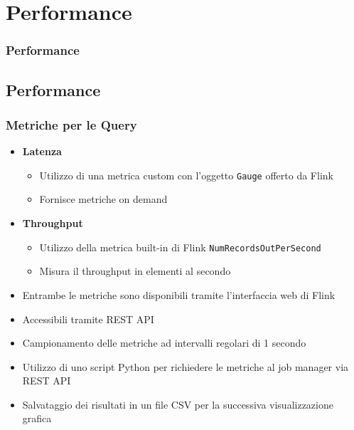\documentclass[13pt,aspectratio=169,t,xcolor=table]{beamer}
\begin{document}
\section{Performance}
\begin{frame}{}
    \frametitle{Performance}
\end{frame}

\subsection{Performance}
\begin{frame}
    \frametitle{Metriche per le Query}
    \begin{itemize}
        \item \textbf{Latenza}
            \begin{itemize}
                \item Utilizzo di una metrica custom con l'oggetto \texttt{Gauge} offerto da Flink
                \item Fornisce metriche on demand
            \end{itemize}
        \item \textbf{Throughput}
            \begin{itemize}
                \item Utilizzo della metrica built-in di Flink \texttt{NumRecordsOutPerSecond}
                \item Misura il throughput in elementi al secondo
            \end{itemize}
    \end{itemize}
    \vspace{0.5cm}
    \begin{itemize}
        \item Entrambe le metriche sono disponibili tramite l'interfaccia web di Flink
        \item Accessibili tramite REST API
    \end{itemize}
    \vspace{0.5cm}
    \begin{itemize}
        \item Campionamento delle metriche ad intervalli regolari di 1 secondo
        \item Utilizzo di uno script Python per richiedere le metriche al job manager via REST API
        \item Salvataggio dei risultati in un file CSV per la successiva visualizzazione grafica
    \end{itemize}
\end{frame}
\end{document}
